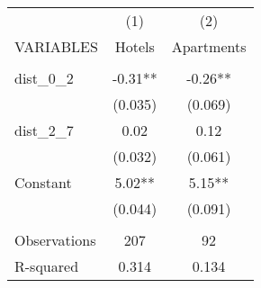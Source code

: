 \begin{tabular}{lcc} \hline
 & (1) & (2) \\
VARIABLES & Hotels & Apartments \\ \hline
 &  &  \\
dist\_0\_2 & -0.31** & -0.26** \\
 & (0.035) & (0.069) \\
dist\_2\_7 & 0.02 & 0.12 \\
 & (0.032) & (0.061) \\
Constant & 5.02** & 5.15** \\
 & (0.044) & (0.091) \\
 &  &  \\
Observations & 207 & 92 \\
 R-squared & 0.314 & 0.134 \\ \hline
\end{tabular}
